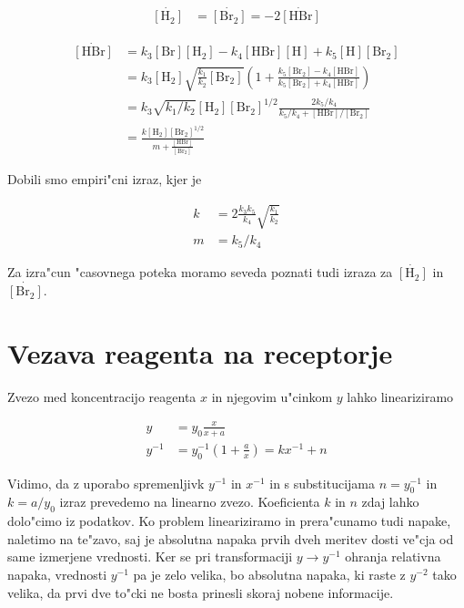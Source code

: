 \documentclass[a4paper,10pt]{article}
\newcommand{\HH}{\ensuremath{[\mathrm{H_2}]}}
\newcommand{\BBr}{\ensuremath{[\mathrm{Br_2}]}}
\newcommand{\HBr}{\ensuremath{[\mathrm{HBr}]}}
\begin{document}
\begin{align}
 \dot{[\mathrm{H_2}]} &= \dot{[\mathrm{Br_2}]} = -2\dot{[\mathrm{HBr}]}
\end{align}


\begin{align}
 \dot{[\mathrm{HBr}]} &= k_3 [\mathrm{Br}] [\mathrm{H_2}] - k_4 [\mathrm{HBr}] [\mathrm{H}] + k_5 [\mathrm{H}] [\mathrm{Br_2}] \\
  &= k_3 \HH \sqrt{\frac{k_1}{k_2}\BBr} \left( 1 + \frac{k_5\BBr - k_4 \HBr}{k_5\BBr + k_4 \HBr} \right) \\
  &= k_3 \sqrt{k_1/k_2} \HH\BBr^{1/2} \frac{2k_5/k_4}{k_5/k_4  + \HBr/\BBr} \\
  &= \frac{k\HH\BBr^{1/2}}{m + \frac{\HBr}{\BBr}}
\end{align}

Dobili smo empiri"cni izraz, kjer je 

\begin{align}
 k &= 2\frac{k_3k_5}{k_4}\sqrt{\frac{k_1}{k_2}} \\
 m &= k_5/k_4
\end{align}

Za izra"cun "casovnega poteka moramo seveda poznati tudi izraza za $\dot{\HH}$ in $\dot{\BBr}$. 

\begin{figure}
 
\end{figure}

\begin{figure}
 
\end{figure}

\section{Vezava reagenta na receptorje}

Zvezo med koncentracijo reagenta $x$ in njegovim u"cinkom $y$ lahko lineariziramo

\begin{align}
 y &= y_0\frac{x}{x+a} \\
  y^{-1} &= y_0^{-1} \left( 1 + \frac{a}{x} \right) = k x^{-1} + n
\end{align}

Vidimo, da z uporabo spremenljivk $y^{-1}$ in $x^{-1}$ in s substitucijama $n = y_0^{-1}$ in $k = a/y_0$ izraz prevedemo na linearno zvezo. Koeficienta $k$ in $n$ zdaj lahko dolo"cimo iz podatkov. Ko problem lineariziramo in prera"cunamo tudi napake, naletimo na te"zavo, saj je absolutna napaka prvih dveh meritev dosti ve"cja od same izmerjene vrednosti. Ker se pri transformaciji $y\to y^{-1}$ ohranja relativna napaka, vrednosti $y^{-1}$ pa je zelo velika, bo absolutna napaka, ki raste z $y^{-2}$ tako velika, da prvi dve to"cki ne bosta prinesli skoraj nobene informacije. 
\end{document}
